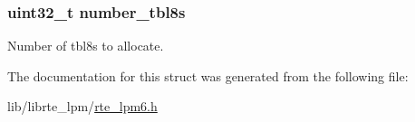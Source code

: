 \subsubsection[{number\+\_\+tbl8s}]{\setlength{\rightskip}{0pt plus 5cm}uint32\+\_\+t number\+\_\+tbl8s}\label{structrte__lpm6__config_a26b1de46eddcd0f3aae08f8a5fa7bd2d}
Number of tbl8s to allocate. 

The documentation for this struct was generated from the following file\+:\begin{DoxyCompactItemize}
\item 
lib/librte\+\_\+lpm/\hyperlink{rte__lpm6_8h}{rte\+\_\+lpm6.\+h}\end{DoxyCompactItemize}
